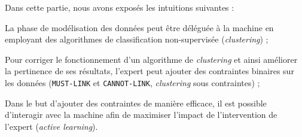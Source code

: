 	\begin{leftBarSummary}
		Dans cette partie, nous avons exposés les intuitions suivantes :
		\begin{todolist}
			\item[\itemok] La phase de modélisation des données peut être déléguée à la machine en employant des algorithmes de classification non-supervisée (\textit{clustering}) ;
			\item[\itemok] Pour corriger le fonctionnement d'un algorithme de \textit{clustering} et ainsi améliorer la pertinence de ses résultats, l'expert peut ajouter des contraintes binaires sur les données (\texttt{MUST-LINK} et \texttt{CANNOT-LINK}, \textit{clustering} sous contraintes) ;
			\item[\itemok] Dans le but d'ajouter des contraintes de manière efficace, il est possible d'interagir avec la machine afin de maximiser l'impact de l'intervention de l'expert (\textit{active learning}).
		\end{todolist}
	\end{leftBarSummary}